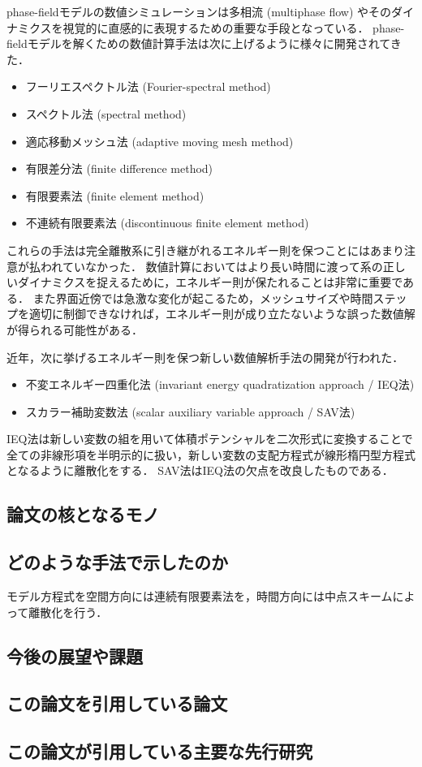 \documentclass[openary, a4paper, oneside]{jsarticle}
\begin{document}
  phase-fieldモデルの数値シミュレーションは多相流 (multiphase flow) やそのダイナミクスを視覚的に直感的に表現するための重要な手段となっている．
  phase-fieldモデルを解くための数値計算手法は次に上げるように様々に開発されてきた．
  \begin{itemize}
    \item フーリエスペクトル法 (Fourier-spectral method)
    \item スペクトル法 (spectral method)
    \item 適応移動メッシュ法 (adaptive moving mesh method)
    \item 有限差分法 (finite difference method)
    \item 有限要素法 (finite element method)
    \item 不連続有限要素法 (discontinuous finite element method)
  \end{itemize}
  これらの手法は完全離散系に引き継がれるエネルギー則を保つことにはあまり注意が払われていなかった．
  数値計算においてはより長い時間に渡って系の正しいダイナミクスを捉えるために，エネルギー則が保たれることは非常に重要である．
  また界面近傍では急激な変化が起こるため，メッシュサイズや時間ステップを適切に制御できなければ，エネルギー則が成り立たないような誤った数値解が得られる可能性がある．

  近年，次に挙げるエネルギー則を保つ新しい数値解析手法の開発が行われた．
  \begin{itemize}
    \item 不変エネルギー四重化法 (invariant energy quadratization approach / IEQ法)
    \item スカラー補助変数法 (scalar auxiliary variable approach / SAV法)
  \end{itemize}
  IEQ法は新しい変数の組を用いて体積ポテンシャルを二次形式に変換することで全ての非線形項を半明示的に扱い，新しい変数の支配方程式が線形楕円型方程式となるように離散化をする．
  SAV法はIEQ法の欠点を改良したものである．


  \subsection{論文の核となるモノ}
  \subsection{どのような手法で示したのか}
  モデル方程式を空間方向には連続有限要素法を，時間方向には中点スキームによって離散化を行う．
  \subsection{今後の展望や課題}
  \subsection{この論文を引用している論文}
  \subsection{この論文が引用している主要な先行研究}


\newpage

\end{document}
